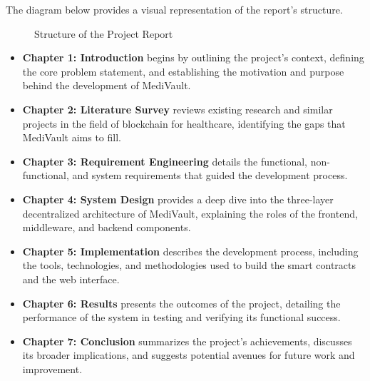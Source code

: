The diagram below provides a visual representation of the report's structure.

\begin{figure}[h!]
\centering
{}
\caption{Structure of the Project Report}
\label{fig:roadmap}
\end{figure}

\begin{itemize}
    \item \textbf{Chapter 1: Introduction} begins by outlining the project's context, defining the core problem statement, and establishing the motivation and purpose behind the development of MediVault.
    \item \textbf{Chapter 2: Literature Survey} reviews existing research and similar projects in the field of blockchain for healthcare, identifying the gaps that MediVault aims to fill.
    \item \textbf{Chapter 3: Requirement Engineering} details the functional, non-functional, and system requirements that guided the development process.
    \item \textbf{Chapter 4: System Design} provides a deep dive into the three-layer decentralized architecture of MediVault, explaining the roles of the frontend, middleware, and backend components.
    \item \textbf{Chapter 5: Implementation} describes the development process, including the tools, technologies, and methodologies used to build the smart contracts and the web interface.
    \item \textbf{Chapter 6: Results} presents the outcomes of the project, detailing the performance of the system in testing and verifying its functional success.
    \item \textbf{Chapter 7: Conclusion} summarizes the project's achievements, discusses its broader implications, and suggests potential avenues for future work and improvement.
\end{itemize}
